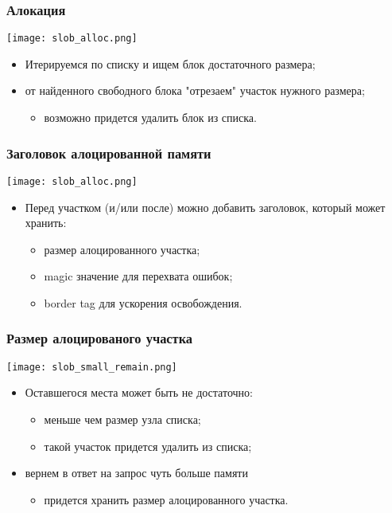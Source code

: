 \begin{frame}
\frametitle{Алокация}
\begin{center}
  \texttt{[image: slob\_alloc.png]}
\end{center}
\begin{itemize}
  \item Итерируемся по списку и ищем блок достаточного размера;
  \item от найденного свободного блока "отрезаем" участок нужного размера;
  \begin{itemize}
    \item возможно придется удалить блок из списка.
  \end{itemize}
\end{itemize}
\end{frame}

\begin{frame}
\frametitle{Заголовок алоцированной памяти}
\begin{center}
  \texttt{[image: slob\_alloc.png]}
\end{center}
\begin{itemize}
  \item Перед участком (и/или после) можно добавить заголовок, который может
  хранить:
  \begin{itemize}
    \item размер алоцированного участка;
    \item magic значение для перехвата ошибок;
    \item border tag для ускорения освобождения.
  \end{itemize}
\end{itemize}
\end{frame}

\begin{frame}
\frametitle{Размер алоцированого участка}
\begin{center}
  \texttt{[image: slob\_small\_remain.png]}
\end{center}
\begin{itemize}
  \item Оставшегося места может быть не достаточно:
  \begin{itemize}
    \item меньше чем размер узла списка;
    \item такой участок придется удалить из списка;
  \end{itemize}
  \item вернем в ответ на запрос чуть больше памяти
  \begin{itemize}
    \item придется хранить размер алоцированного участка.
  \end{itemize}
\end{itemize}
\end{frame}

